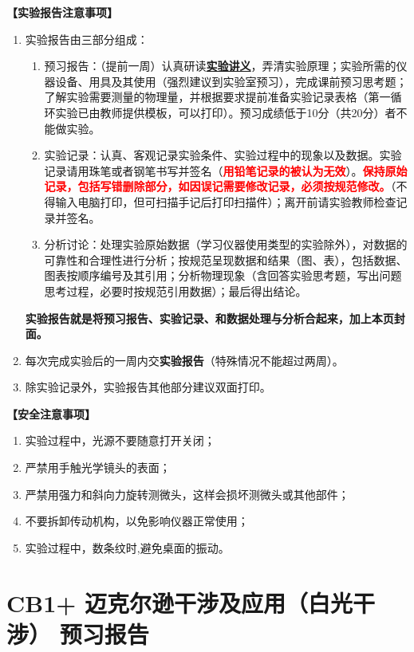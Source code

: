 \documentclass[dvipsnames, svgnames,a4paper,11pt]{article}
\begin{document}
\textbf{【实验报告注意事项】}
\begin{enumerate}
	\item 实验报告由三部分组成：
		\begin{enumerate}
			\item 预习报告：（提前一周）认真研读\underline{\textbf{实验讲义}}，弄清实验原理；实验所需的仪器设备、用具及其使用（强烈建议到实验室预习），完成课前预习思考题；了解实验需要测量的物理量，并根据要求提前准备实验记录表格（第一循环实验已由教师提供模板，可以打印）。预习成绩低于10分（共20分）者不能做实验。
		    \item 实验记录：认真、客观记录实验条件、实验过程中的现象以及数据。实验记录请用珠笔或者钢笔书写并签名（\textcolor{red}{\textbf{用铅笔记录的被认为无效}}）。\textcolor{red}{\textbf{保持原始记录，包括写错删除部分，如因误记需要修改记录，必须按规范修改。}}（不得输入电脑打印，但可扫描手记后打印扫描件）；离开前请实验教师检查记录并签名。
		    \item 分析讨论：处理实验原始数据（学习仪器使用类型的实验除外），对数据的可靠性和合理性进行分析；按规范呈现数据和结果（图、表），包括数据、图表按顺序编号及其引用；分析物理现象（含回答实验思考题，写出问题思考过程，必要时按规范引用数据）；最后得出结论。
		\end{enumerate}
	\textbf{实验报告就是将预习报告、实验记录、和数据处理与分析合起来，加上本页封面。}
	
	\item 每次完成实验后的一周内交\textbf{实验报告}（特殊情况不能超过两周）。
	
	\item 除实验记录外，实验报告其他部分建议双面打印。
\end{enumerate}
\textbf{【安全注意事项】}
	\begin{enumerate}
		\item 实验过程中，光源不要随意打开关闭；
		\item 严禁用手触光学镜头的表面；
		\item 严禁用强力和斜向力旋转测微头，这样会损坏测微头或其他部件；
		\item 不要拆卸传动机构，以免影响仪器正常使用；
		\item 实验过程中，数条纹时,避免桌面的振动。
	\end{enumerate}

\clearpage
\tableofcontents
\clearpage

\setcounter{section}{0}
\section{CB1+ \quad 迈克尔逊干涉及应用（白光干涉） \quad\heiti 预习报告}
	
\end{document}
